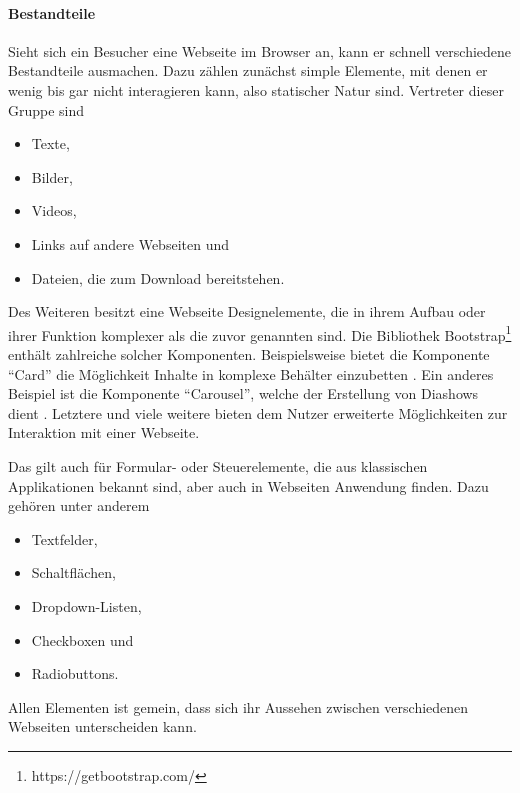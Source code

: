         \paragraph*{Bestandteile}
        Sieht sich ein Besucher eine Webseite im Browser an,
        kann er schnell verschiedene Bestandteile ausmachen.
        Dazu zählen zunächst simple Elemente, mit denen er wenig bis gar nicht
        interagieren kann, also statischer Natur sind.
        Vertreter dieser Gruppe sind

        \begin{itemize}
            \item Texte,
            \item Bilder,
            \item Videos,
            \item Links auf andere Webseiten und
            \item Dateien, die zum Download bereitstehen.
        \end{itemize}

        Des Weiteren besitzt eine Webseite Designelemente,
        die in ihrem Aufbau oder ihrer Funktion komplexer
        als die zuvor genannten sind.
        Die Bibliothek Bootstrap\footnote{https://getbootstrap.com/}
        enthält zahlreiche solcher Komponenten.
        Beispielsweise bietet die Komponente "`Card"' die Möglichkeit
        Inhalte in kom\-plexe Behälter einzubetten \cite{bootstrap:Cards}.
        Ein anderes Beispiel ist die Komponente "`Carousel"',
        welche der Erstellung von Diashows dient \cite{bootstrap:Carousel}.
        Letztere und viele weitere bieten dem Nutzer
        erweiterte Möglichkeiten zur Interaktion mit einer Webseite.

        Das gilt auch für Formular- oder Steuerelemente,
        die aus klassischen Applikationen bekannt sind,
        aber auch in Webseiten Anwendung finden.
        Dazu gehören unter anderem

        \begin{itemize}
            \item Textfelder,
            \item Schaltflächen,
            \item Dropdown-Listen,
            \item Checkboxen und
            \item Radiobuttons.
        \end{itemize}

        Allen Elementen ist gemein, dass sich ihr Aussehen
        zwischen verschiedenen Webseiten unterscheiden kann.

